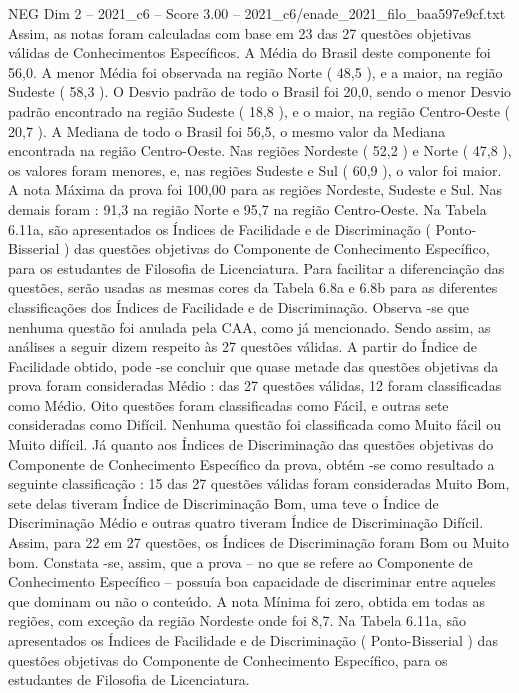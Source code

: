 \begin{textsample}{NEG Dim 2 – 2021\_c6 – Score 3.00 – 2021\_c6/enade\_2021\_filo\_baa597e9cf.txt}
Assim, as notas foram calculadas com base em 23 das 27 questões objetivas válidas de Conhecimentos Específicos.
A Média do Brasil deste componente foi 56,0.
A menor Média foi observada na região Norte ( 48,5 ), e a maior, na região Sudeste ( 58,3 ).
O Desvio padrão de todo o Brasil foi 20,0, sendo o menor Desvio padrão encontrado na região Sudeste ( 18,8 ), e o maior, na região Centro-Oeste ( 20,7 ).
A Mediana de todo o Brasil foi 56,5, o mesmo valor da Mediana encontrada na região Centro-Oeste.
Nas regiões Nordeste ( 52,2 ) e Norte ( 47,8 ), os valores foram menores, e, nas regiões Sudeste e Sul ( 60,9 ), o valor foi maior.
A nota Máxima da prova foi 100,00 para as regiões Nordeste, Sudeste e Sul.
Nas demais foram : 91,3 na região Norte e 95,7 na região Centro-Oeste.
Na Tabela 6.11a, são apresentados os Índices de Facilidade e de Discriminação ( Ponto-Bisserial ) das questões objetivas do Componente de Conhecimento Específico, para os estudantes de Filosofia de Licenciatura.
Para facilitar a diferenciação das questões, serão usadas as mesmas cores da Tabela 6.8a e 6.8b para as diferentes classificações dos Índices de Facilidade e de Discriminação.
Observa -se que nenhuma questão foi anulada pela CAA, como já mencionado.
Sendo assim, as análises a seguir dizem respeito às 27 questões válidas.
A partir do Índice de Facilidade obtido, pode -se concluir que quase metade das questões objetivas da prova foram consideradas Médio : das 27 questões válidas, 12 foram classificadas como Médio.
Oito questões foram classificadas como Fácil, e outras sete consideradas como Difícil.
Nenhuma questão foi classificada como Muito fácil ou Muito difícil.
Já quanto aos Índices de Discriminação das questões objetivas do Componente de Conhecimento Específico da prova, obtém -se como resultado a seguinte classificação : 15 das 27 questões válidas foram consideradas Muito Bom, sete delas tiveram Índice de Discriminação Bom, uma teve o Índice de Discriminação Médio e outras quatro tiveram Índice de Discriminação Difícil.
Assim, para 22 em 27 questões, os Índices de Discriminação foram Bom ou Muito bom.
Constata -se, assim, que a prova – no que se refere ao Componente de Conhecimento Específico – possuía boa capacidade de discriminar entre aqueles que dominam ou não o conteúdo.
A nota Mínima foi zero, obtida em todas as regiões, com exceção da região Nordeste onde foi 8,7.
Na Tabela 6.11a, são apresentados os Índices de Facilidade e de Discriminação ( Ponto-Bisserial ) das questões objetivas do Componente de Conhecimento Específico, para os estudantes de Filosofia de Licenciatura.

\end{textsample}
